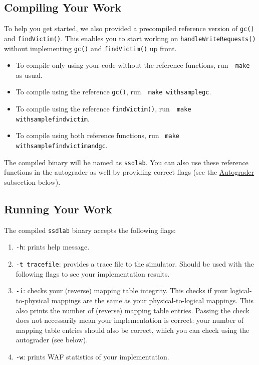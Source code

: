 \documentclass[11pt]{article}
\begin{document}
\subsection{Compiling Your Work}

To help you get started, 
we also provided a precompiled reference version of \texttt{gc()} and \texttt{findVictim()}. 
This enables you to start working on \texttt{handleWriteRequests()} without implementing \texttt{gc()} and \texttt{findVictim()} up front.
\begin{itemize}
    \item To compile only using your code without the reference functions, run~\texttt{ make } as usual.
    \item To compile using the reference \texttt{gc()}, run~\texttt{ make withsamplegc}.
    \item To compile using the reference \texttt{findVictim()}, run~\texttt{ make withsamplefindvictim}.
    \item To compile using both reference functions, run \texttt{ make withsamplefindvictimandgc}.
\end{itemize}

The compiled binary will be named as \texttt{ssdlab}. 
You can also use these reference functions in the autograder as well by providing correct flags (see the \hyperref[sec:autograder]{Autograder} subsection below).

\subsection{Running Your Work}

The compiled \texttt{ssdlab} binary accepts the following flags:

\begin{enumerate}
    \item \texttt{-h}: prints help message.
    \item \texttt{-t tracefile}: provides a trace file to the simulator. Should be used with the following flags to see your implementation results.
    \item \texttt{-i}: checks your (reverse) mapping table integrity. This checks if your logical-to-physical mappings are the same as your physical-to-logical mappings. This also prints the number of (reverse) mapping table entries. Passing the check does not necessarily mean your implementation is correct: your number of mapping table entries should also be correct, which you can check using the autograder (see below).
    \item \texttt{-w}: prints WAF statistics of your implementation.
\end{enumerate}
\end{document}
